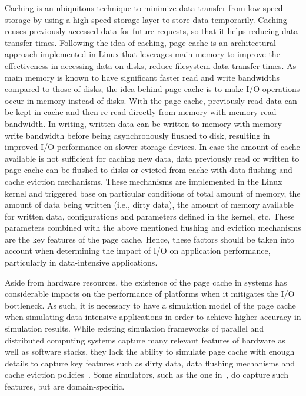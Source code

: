 Caching is an ubiquitous technique to minimize data transfer 
from low-speed storage by using a high-speed storage layer to store data 
temporarily. Caching reuses previously accessed data for future requests, so 
that it helps reducing data transfer times. 
Following the idea of caching, page cache is an architectural approach 
implemented in Linux that leverages main memory to improve the effectiveness 
in accessing data on disks, reduce filesystem data transfer times.
As main memory is known to have significant faster read and write bandwidths 
compared to those of disks, the idea behind page cache is to make I/O operations 
occur in memory instead of disks.
With the page cache, previously read data can be kept in cache and then re-read 
directly from memory with memory read bandwidth. 
In writing, written data can be written to memory with memory write bandwidth 
before being asynchronously flushed to disk, resulting in improved I/O performance 
on slower storage devices. 
In case the amount of cache available is not sufficient for caching new data, 
data previously read or written to page cache can be flushed to disks or 
evicted from cache with data flushing and cache eviction mechanisms. 
These mechanisms are implemented in the Linux kernel and triggered 
base on particular conditions of total amount of memory, the amount of data 
being written (i.e., dirty data), the amount of memory available for written data, 
configurations and parameters defined in the kernel, etc.
These parameters combined with the above mentioned flushing and eviction 
mechanisms are the key features of the page cache. 
Hence, these factors should be taken into account when determining the impact 
of I/O on application performance, particularly in data-intensive applications.

Aside from hardware resources, the existence of the page cache in systems has 
considerable impacts on the performance of platforms when it mitigates the I/O 
bottleneck.
As such, it is necessary to have a simulation model of the page cache when 
simulating data-intensive applications in order to achieve higher accuracy  
in simulation results.
While existing simulation frameworks of parallel and distributed computing
systems capture many relevant features of hardware as well as software stacks, 
they lack the ability to simulate page cache with enough details to capture 
key features such as dirty data, data flushing mechanisms and cache eviction 
policies~\cite{nunez2012simcan,nunez2012icancloud}. 
Some simulators, such as the one in~\cite{xu2018saving}, do capture such 
features, but are domain-specific. 


